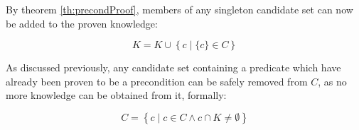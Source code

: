 \documentclass[../../Master.tex]{subfiles}
\begin{document}

By theorem \ref{th:precondProof}, members of any singleton candidate set can now be added to the proven knowledge:

\begin{equation} \label{eq:extractKnown}
    K = K \cup \left\{ c \; | \; \{ c \} \in C \right\}
\end{equation}


As discussed previously, any candidate set containing a predicate which have already been proven to be a precondition can be safely removed from $C$, as no more knowledge can be obtained from it, formally:

\begin{equation} \label{eq:removeKnown}
    C = \left\{ c \; | \; c \in C \land c \cap K \neq \emptyset \right\}
\end{equation}

\end{document}
